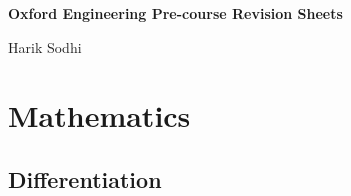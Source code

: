 \documentclass{article}
\begin{document}
\begin{titlepage}
    \centering
    \vspace*{\fill}

    \vspace*{0.5cm}

    \huge\bfseries
    Oxford Engineering Pre-course Revision Sheets
    \vspace*{0.5cm}

    \large Harik Sodhi

    \vspace*{\fill}
\end{titlepage}
\section{Mathematics}
\subsection{Differentiation}
\end{document}
